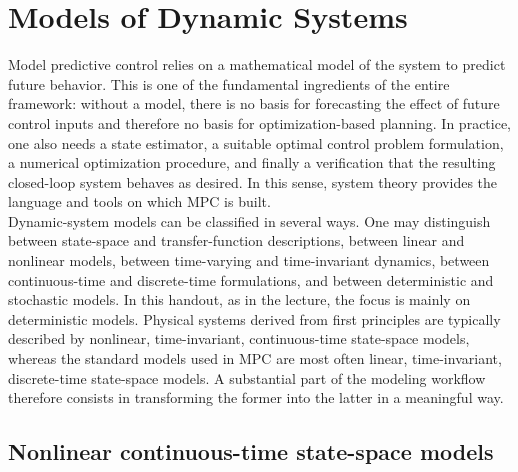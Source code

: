 \section{Models of Dynamic Systems}

Model predictive control relies on a mathematical model of the system to predict future behavior. This is one of the fundamental ingredients of the entire framework: without a model, there is no basis for forecasting the effect of future control inputs and therefore no basis for optimization-based planning. In practice, one also needs a state estimator, a suitable optimal control problem formulation, a numerical optimization procedure, and finally a verification that the resulting closed-loop system behaves as desired. In this sense, system theory provides the language and tools on which MPC is built.\\

Dynamic-system models can be classified in several ways. One may distinguish between state-space and transfer-function descriptions, between linear and nonlinear models, between time-varying and time-invariant dynamics, between continuous-time and discrete-time formulations, and between deterministic and stochastic models. In this handout, as in the lecture, the focus is mainly on deterministic models. Physical systems derived from first principles are typically described by nonlinear, time-invariant, continuous-time state-space models, whereas the standard models used in MPC are most often linear, time-invariant, discrete-time state-space models. A substantial part of the modeling workflow therefore consists in transforming the former into the latter in a meaningful way.

\subsection{Nonlinear continuous-time state-space models}

